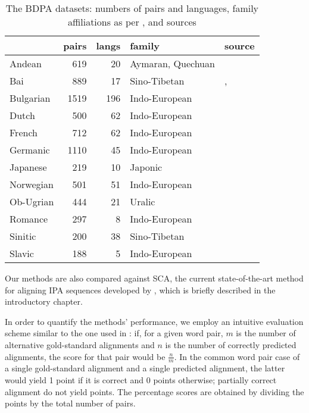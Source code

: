 \documentclass[a4paper]{report}
\begin{document}
\begin{table}[h]
	\centering\small
	\begin{tabular}{l r r l l}
		\toprule
		& pairs & langs & family & source \\
		\midrule
		Andean		& 619	& 20	& Aymaran, Quechuan	& \citet{2006_Heggarty} \\
		Bai			& 889	& 17	& Sino-Tibetan		& \citet{2006_Wang}, \citet{2007_Allen} \\
		Bulgarian	& 1519	& 196	& Indo-European		& \citet{2009_Prokić_al} \\
		Dutch		& 500	& 62	& Indo-European		& \citet{2005_Schutter_al} \\
		French		& 712	& 62	& Indo-European		& \citet{1925_Gauchat_al} \\
		Germanic	& 1110	& 45	& Indo-European		& \citet{2009_Renfrew_Heggarty} \\
		Japanese	& 219	& 10	& Japonic			& \citet{1973_Shirō} \\
		Norwegian	& 501	& 51	& Indo-European		& \citet{2011_Almberg_Skarbø} \\
		Ob-Ugrian	& 444	& 21	& Uralic			& \citet{2011_Zhivlov} \\
		Romance		& 297	& 8		& Indo-European		& \citet{2009_Renfrew_Heggarty} \\
		Sinitic		& 200	& 38	& Sino-Tibetan		& \citet{2004_Hóu} \\
		Slavic		& 188	& 5		& Indo-European		& \citet{2008_Derksen} \\
		\bottomrule
	\end{tabular}
	\caption{The BDPA datasets: numbers of pairs and languages, family affiliations as per \citet{2018_Hammarström_al}, and sources}
	\label{tab:bdpa}
\end{table}

Our methods are also compared against SCA, the current state-of-the-art method for aligning IPA sequences developed by \citet{2012_List},
which is briefly described in the introductory chapter.

In order to quantify the methods' performance, we employ an intuitive evaluation scheme similar to the one used in \citet{2002_Kondrak_Hirst}:
if, for a given word pair, $m$ is the number of alternative gold-standard alignments
and $n$ is the number of correctly predicted alignments, the score for that pair would be $\frac{n}{m}$.
In the common word pair case of a single gold-standard alignment and a single predicted alignment,
the latter would yield 1 point if it is correct and 0 points otherwise;
partially correct alignment do not yield points.
The percentage scores are obtained by dividing the points by the total number of pairs.
\end{document}
